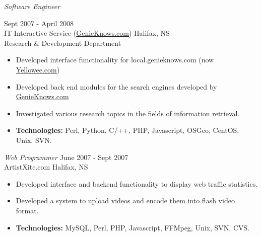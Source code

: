 \documentclass[line,margin]{res}
\begin{document}
\begin{resume}
\newpage
\opening

   {\sl Software Engineer} \hfill Sept 2007 - April 2008 \\
    IT Interactive Service (\href{http://www.genieknows.com}{GenieKnows.com}) \hfill Halifax, NS \\
    Research {\&} Development Department \smallskip
    \begin{itemize}  \itemsep -2pt %
     \item Developed interface functionality for
             local.genieknows.com (now \href{http://www.yellowee.com}{Yellowee.com})
     \item Developed back end modules for the search
             engines developed by
             \href{http://www.genieknows.com}{GenieKnows.com}
     \item Investigated various research topics
             in the fields of information retrieval.
     \item {\bf Technologies:} \hspace{1pt}
        Perl, Python, C/++, PHP, Javascript, OSGeo, CentOS, \\
        \hspace*{72pt} Unix, SVN.
    \end{itemize}

   {\sl Web Programmer} \hfill June 2007 - Sept 2007 \\
    ArtistXite.com \hfill Halifax, NS \smallskip
    \begin{itemize}  \itemsep -2pt %
     \item Developed interface and backend functionality to display
               web traffic statistics.
     \item Developed a system to upload videos and encode them
                into flash video format.
     \item {\bf Technologies:}\hspace{4pt}
        MySQL, Perl, PHP, Javascript, FFMpeg, Unix, SVN, CVS.
    \end{itemize}


\end{resume}
\end{document}
